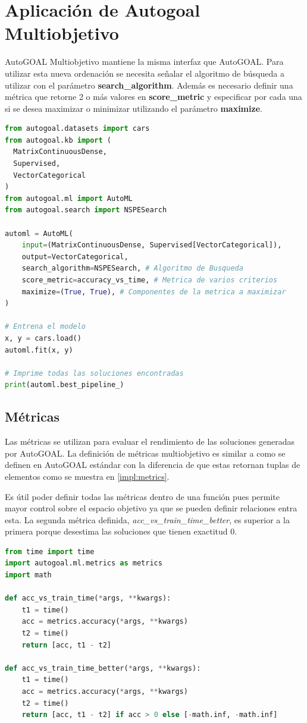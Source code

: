 \section{Aplicaci\'on de Autogoal Multiobjetivo}
AutoGOAL Multiobjetivo mantiene la misma interfaz que AutoGOAL. Para utilizar esta nueva ordenaci\'on se necesita  se\~nalar el algoritmo de b\'usqueda a utilizar con el par\'ametro \textbf{search\_algorithm}. Adem\'as es necesario definir una m\'etrica que retorne 2 o m\'as valores en \textbf{score\_metric} y especificar por cada una si se desea maximizar o minimizar utilizando el par\'ametro  \textbf{maximize}. 

\begin{lstlisting}[caption=Uso de AutoGOAL con multiobjetivo, language=Python]
from autogoal.datasets import cars
from autogoal.kb import (
  MatrixContinuousDense,
  Supervised,
  VectorCategorical
)
from autogoal.ml import AutoML
from autogoal.search import NSPESearch

automl = AutoML(
    input=(MatrixContinuousDense, Supervised[VectorCategorical]),
    output=VectorCategorical,
    search_algorithm=NSPESearch, # Algoritmo de Busqueda
    score_metric=accuracy_vs_time, # Metrica de varios criterios
    maximize=(True, True), # Componentes de la metrica a maximizar
)

# Entrena el modelo
x, y = cars.load()
automl.fit(x, y)

# Imprime todas las soluciones encontradas
print(automl.best_pipeline_) 
\end{lstlisting}

\subsection{M\'etricas}
Las m\'etricas se utilizan para evaluar el rendimiento de las soluciones generadas por AutoGOAL.
La definici\'on de m\'etricas multiobjetivo  es similar a como se definen en AutoGOAL est\'andar con la diferencia de que estas retornan tuplas de elementos como se muestra en \ref{impl:metrics}. 

Es \'util poder definir todas las m\'etricas dentro de una funci\'on pues permite mayor control sobre el espacio objetivo ya que se pueden definir relaciones entra esta. La segunda m\'etrica definida, \textit{acc\_vs\_train\_time\_better}, es superior a la primera porque desestima las soluciones que tienen exactitud 0.

\begin{lstlisting}[caption=Ejemplo de m\'etrica: \textit{accuracy} contra tiempo, language=Python, label=impl:metrics]
from time import time
import autogoal.ml.metrics as metrics
import math

def acc_vs_train_time(*args, **kwargs):
    t1 = time()
    acc = metrics.accuracy(*args, **kwargs)
    t2 = time()
    return [acc, t1 - t2]

def acc_vs_train_time_better(*args, **kwargs):
    t1 = time()
    acc = metrics.accuracy(*args, **kwargs)
    t2 = time()
    return [acc, t1 - t2] if acc > 0 else [-math.inf, -math.inf]
\end{lstlisting}
